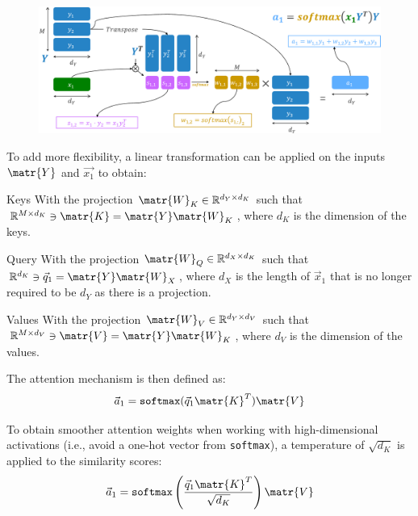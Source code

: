 \begin{description}
        \begin{figure}[H]
            \centering
            \includegraphics[width=0.8\linewidth]{./img/_dot_product_attention.pdf}
        \end{figure}

    \item[Scaled dot-product attention] 
        To add more flexibility, a linear transformation can be applied on the inputs $\matr{Y}$ and $\vec{x_1}$ to obtain:
        \begin{descriptionlist}
            \item[Keys] 
                With the projection $\matr{W}_K \in \mathbb{R}^{d_Y \times d_K}$ such that $\mathbb{R}^{M \times d_K} \ni \matr{K} = \matr{Y} \matr{W}_K$, where $d_K$ is the dimension of the keys.

            \item[Query] 
                With the projection $\matr{W}_Q \in \mathbb{R}^{d_X \times d_K}$ such that $\mathbb{R}^{d_K} \ni \vec{q}_1 = \matr{Y} \matr{W}_X$, where $d_X$ is the length of $\vec{x}_1$ that is no longer required to be $d_Y$ as there is a projection.

            \item[Values]
                With the projection $\matr{W}_V \in \mathbb{R}^{d_Y \times d_V}$ such that $\mathbb{R}^{M \times d_V} \ni \matr{V} = \matr{Y} \matr{W}_K$, where $d_V$ is the dimension of the values.
        \end{descriptionlist}

        The attention mechanism is then defined as:
        \[ \vec{a}_1 = \texttt{softmax}(\vec{q}_1 \matr{K}^T)\matr{V} \]

        To obtain smoother attention weights when working with high-dimensional activations (i.e., avoid a one-hot vector from \texttt{softmax}), a temperature of $\sqrt{d_K}$ is applied to the similarity scores:
        \[ \vec{a}_1 = \texttt{softmax}\left( \frac{\vec{q}_1 \matr{K}^T}{\sqrt{d_K}} \right)\matr{V} \]


\end{description}
